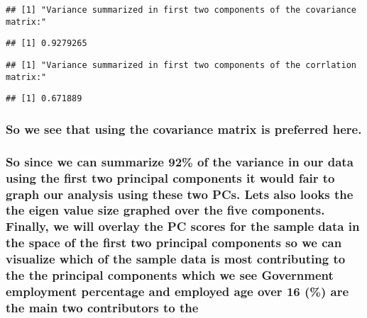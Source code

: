 \documentclass[]{article}
\begin{document}
\begin{verbatim}
## [1] "Variance summarized in first two components of the covariance matrix:"
\end{verbatim}

\begin{verbatim}
## [1] 0.9279265
\end{verbatim}

\begin{verbatim}
## [1] "Variance summarized in first two components of the corrlation matrix:"
\end{verbatim}

\begin{verbatim}
## [1] 0.671889
\end{verbatim}

\hypertarget{so-we-see-that-using-the-covariance-matrix-is-preferred-here.}{%
\subsubsection{So we see that using the covariance matrix is preferred
here.}\label{so-we-see-that-using-the-covariance-matrix-is-preferred-here.}}

\hypertarget{so-since-we-can-summarize-92-of-the-variance-in-our-data-using-the-first-two-principal-components-it-would-fair-to-graph-our-analysis-using-these-two-pcs.-lets-also-looks-the-the-eigen-value-size-graphed-over-the-five-components.-finally-we-will-overlay-the-pc-scores-for-the-sample-data-in-the-space-of-the-first-two-principal-components-so-we-can-visualize-which-of-the-sample-data-is-most-contributing-to-the-the-principal-components-which-we-see-government-employment-percentage-and-employed-age-over-16-are-the-main-two-contributors-to-the}{%
\subsubsection{So since we can summarize 92\% of the variance in our
data using the first two principal components it would fair to graph our
analysis using these two PCs. Lets also looks the the eigen value size
graphed over the five components. Finally, we will overlay the PC scores
for the sample data in the space of the first two principal components
so we can visualize which of the sample data is most contributing to the
the principal components which we see Government employment percentage
and employed age over 16 (\%) are the main two contributors to
the}\label{so-since-we-can-summarize-92-of-the-variance-in-our-data-using-the-first-two-principal-components-it-would-fair-to-graph-our-analysis-using-these-two-pcs.-lets-also-looks-the-the-eigen-value-size-graphed-over-the-five-components.-finally-we-will-overlay-the-pc-scores-for-the-sample-data-in-the-space-of-the-first-two-principal-components-so-we-can-visualize-which-of-the-sample-data-is-most-contributing-to-the-the-principal-components-which-we-see-government-employment-percentage-and-employed-age-over-16-are-the-main-two-contributors-to-the}}
\end{document}
